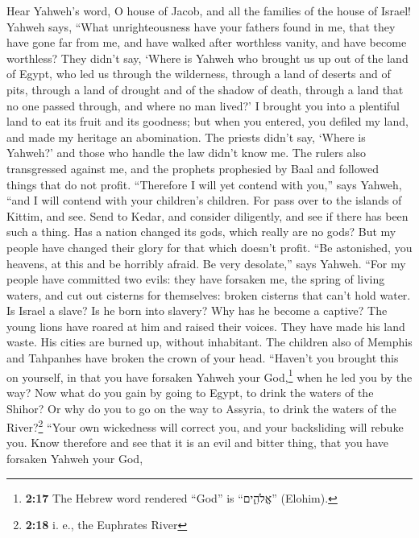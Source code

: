  Hear Yahweh's word, O house of Jacob, and all the
families of the house of Israel!  Yahweh says, ``What
unrighteousness have your fathers found in me, that they have gone far
from me, and have walked after worthless vanity, and have become
worthless?  They didn't say, `Where is Yahweh who brought
us up out of the land of Egypt, who led us through the wilderness,
through a land of deserts and of pits, through a land of drought and of
the shadow of death, through a land that no one passed through, and
where no man lived?'  I brought you into a plentiful land
to eat its fruit and its goodness; but when you entered, you defiled my
land, and made my heritage an abomination.  The priests
didn't say, `Where is Yahweh?' and those who handle the law didn't know
me. The rulers also transgressed against me, and the prophets prophesied
by Baal and followed things that do not profit. 
``Therefore I will yet contend with you,'' says Yahweh, ``and I will
contend with your children's children.  For pass over to
the islands of Kittim, and see. Send to Kedar, and consider diligently,
and see if there has been such a thing.  Has a nation
changed its gods, which really are no gods? But my people have changed
their glory for that which doesn't profit.  ``Be
astonished, you heavens, at this and be horribly afraid. Be very
desolate,'' says Yahweh.  ``For my people have committed
two evils: they have forsaken me, the spring of living waters, and cut
out cisterns for themselves: broken cisterns that can't hold water.
 Is Israel a slave? Is he born into slavery? Why has he
become a captive?  The young lions have roared at him and
raised their voices. They have made his land waste. His cities are
burned up, without inhabitant.  The children also of
Memphis and Tahpanhes have broken the crown of your head.
 ``Haven't you brought this on yourself, in that you have
forsaken Yahweh your God,\footnote{\textbf{2:17} The Hebrew word
  rendered ``God'' is ``אֱלֹהִ֑ים'' (Elohim).} when he led you by the
way?  Now what do you gain by going to Egypt, to drink
the waters of the Shihor? Or why do you to go on the way to Assyria, to
drink the waters of the River?\footnote{\textbf{2:18} i. e., the
  Euphrates River}  ``Your own wickedness will correct
you, and your backsliding will rebuke you. Know therefore and see that
it is an evil and bitter thing, that you have forsaken Yahweh your God,
